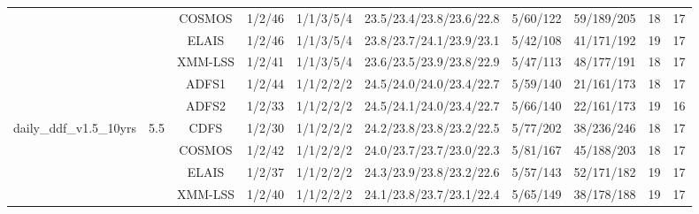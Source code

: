 \begin{center}
\begin{sidewaystable}[htbp]
{\begin{tabular}{c|c|c|c|c|c|c|c|c|c}
& & COSMOS & 1/2/46 & 1/1/3/5/4 & 23.5/23.4/23.8/23.6/22.8 & 5/60/122 & 59/189/205 & 18 & 17 \\ 
& & ELAIS & 1/2/46 & 1/1/3/5/4 & 23.8/23.7/24.1/23.9/23.1 & 5/42/108 & 41/171/192 & 19 & 17 \\ 
& & XMM-LSS & 1/2/41 & 1/1/3/5/4 & 23.6/23.5/23.9/23.8/22.9 & 5/47/113 & 48/177/191 & 18 & 17 \\ 
\hline 
& & ADFS1 & 1/2/44 & 1/1/2/2/2 & 24.5/24.0/24.0/23.4/22.7 & 5/59/140 & 21/161/173 & 18 & 17 \\ 
& & ADFS2 & 1/2/33 & 1/1/2/2/2 & 24.5/24.1/24.0/23.4/22.7 & 5/66/140 & 22/161/173 & 19 & 16 \\ 
daily\_ddf\_v1.5\_10yrs& 5.5& CDFS & 1/2/30 & 1/1/2/2/2 & 24.2/23.8/23.8/23.2/22.5 & 5/77/202 & 38/236/246 & 18 & 17 \\ 
& & COSMOS & 1/2/42 & 1/1/2/2/2 & 24.0/23.7/23.7/23.0/22.3 & 5/81/167 & 45/188/203 & 18 & 17 \\ 
& & ELAIS & 1/2/37 & 1/1/2/2/2 & 24.3/23.9/23.8/23.2/22.6 & 5/57/143 & 52/171/182 & 19 & 17 \\ 
& & XMM-LSS & 1/2/40 & 1/1/2/2/2 & 24.1/23.8/23.7/23.1/22.4 & 5/65/149 & 38/178/188 & 19 & 17 \\ 
\end{tabular}} 
\end{sidewaystable} 
\end{center}